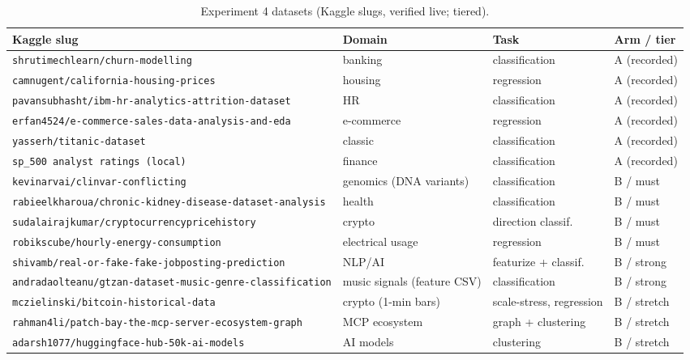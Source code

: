 \begin{table}[H]
\centering
\caption{Experiment 4 datasets (Kaggle slugs, verified live; tiered).}
\label{tab:exp4datasets}
\small
\begin{tabular}{p{6.4cm}p{2.4cm}p{2.0cm}p{2.6cm}}
\toprule
\textbf{Kaggle slug} & \textbf{Domain} & \textbf{Task} & \textbf{Arm / tier} \\
\midrule
\texttt{shrutimechlearn/\allowbreak{}churn-\allowbreak{}modelling} & banking & classification & A (recorded) \\
\texttt{camnugent/\allowbreak{}california-\allowbreak{}housing-\allowbreak{}prices} & housing & regression & A (recorded) \\
\texttt{pavansubhasht/\allowbreak{}ibm-hr-analytics-attrition-dataset} & HR & classification & A (recorded) \\
\texttt{erfan4524/\allowbreak{}e-\allowbreak{}commerce-\allowbreak{}sales-\allowbreak{}data-\allowbreak{}analysis-\allowbreak{}and-\allowbreak{}eda} & e-commerce & regression & A (recorded) \\
\texttt{yasserh/\allowbreak{}titanic-\allowbreak{}dataset} & classic & classification & A (recorded) \\
\texttt{sp\_500 analyst ratings (local)} & finance & classification & A (recorded) \\
\midrule
\texttt{kevinarvai/\allowbreak{}clinvar-\allowbreak{}conflicting} & genomics (DNA variants) & classification & B / must \\
\texttt{rabieelkharoua/\allowbreak{}chronic-\allowbreak{}kidney-\allowbreak{}disease-\allowbreak{}dataset-\allowbreak{}analysis} & health & classification & B / must \\
\texttt{sudalairajkumar/\allowbreak{}cryptocurrencypricehistory} & crypto & direction classif. & B / must \\
\texttt{robikscube/\allowbreak{}hourly-\allowbreak{}energy-\allowbreak{}consumption} & electrical usage & regression & B / must \\
\texttt{shivamb/\allowbreak{}real-\allowbreak{}or-\allowbreak{}fake-\allowbreak{}fake-\allowbreak{}jobposting-\allowbreak{}prediction} & NLP/AI & featurize + classif. & B / strong \\
\texttt{andradaolteanu/\allowbreak{}gtzan-\allowbreak{}dataset-\allowbreak{}music-\allowbreak{}genre-\allowbreak{}classification} & music signals (feature CSV) & classification & B / strong \\
\midrule
\texttt{mczielinski/\allowbreak{}bitcoin-\allowbreak{}historical-\allowbreak{}data} & crypto (1-min bars) & scale-stress, regression & B / stretch \\
\texttt{rahman4li/\allowbreak{}patch-\allowbreak{}bay-\allowbreak{}the-\allowbreak{}mcp-\allowbreak{}server-\allowbreak{}ecosystem-\allowbreak{}graph} & MCP ecosystem & graph + clustering & B / stretch \\
\texttt{adarsh1077/\allowbreak{}huggingface-\allowbreak{}hub-\allowbreak{}50k-\allowbreak{}ai-\allowbreak{}models} & AI models & clustering & B / stretch \\
\bottomrule
\end{tabular}
\end{table}

